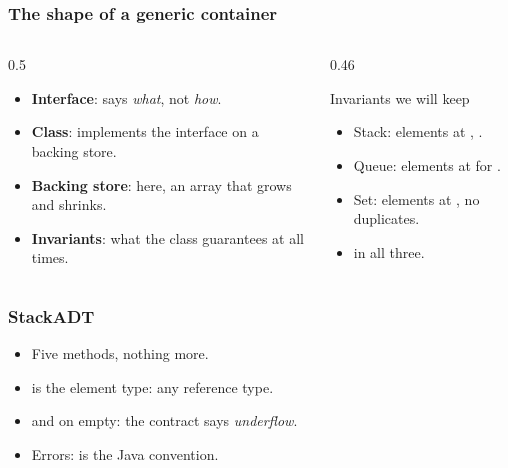 \documentclass[aspectratio=169,10pt,compress]{beamer}
\begin{document}
\begin{frame}[t,fragile] \frametitle{The shape of a generic container}
  \begin{columns}[T]
    \begin{column}{0.5\textwidth}
      \begin{itemize}
        \item \textbf{Interface}: says \emph{what}, not \emph{how}.
        \item \textbf{Class}: implements the interface on a backing store.
        \item \textbf{Backing store}: here, an array that grows and
              shrinks.
        \item \textbf{Invariants}: what the class guarantees at all times.
      \end{itemize}
    \end{column}
    \begin{column}{0.46\textwidth}
      \begin{block}{Invariants we will keep}
        \small
        \begin{itemize}
          \item Stack: elements at ,
                .
          \item Queue: elements at  for
                .
          \item Set: elements at , no duplicates.
          \item {} in all three.
        \end{itemize}
      \end{block}
    \end{column}
  \end{columns}
\end{frame}





\begin{frame}[t,fragile] \frametitle{StackADT}
  \begin{itemize}\small
    \item Five methods, nothing more.
    \item {} is the element type: any reference type.
    \item {} and  on empty: the contract says \emph{underflow}.
    \item Errors:  is the Java convention.
  \end{itemize}
\end{frame}
\end{document}
